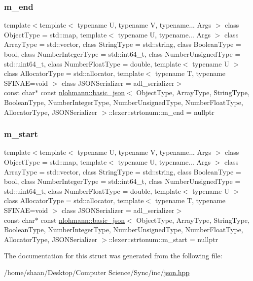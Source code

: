 \subsubsection{\texorpdfstring{m\+\_\+end}{m\_end}}
{\footnotesize\ttfamily template$<$template$<$ typename U, typename V, typename... Args $>$ class Object\+Type = std\+::map, template$<$ typename U, typename... Args $>$ class Array\+Type = std\+::vector, class String\+Type  = std\+::string, class Boolean\+Type  = bool, class Number\+Integer\+Type  = std\+::int64\+\_\+t, class Number\+Unsigned\+Type  = std\+::uint64\+\_\+t, class Number\+Float\+Type  = double, template$<$ typename U $>$ class Allocator\+Type = std\+::allocator, template$<$ typename T, typename S\+F\+I\+N\+A\+E=void $>$ class J\+S\+O\+N\+Serializer = adl\+\_\+serializer$>$ \\
const char$\ast$ const \hyperlink{classnlohmann_1_1basic__json}{nlohmann\+::basic\+\_\+json}$<$ Object\+Type, Array\+Type, String\+Type, Boolean\+Type, Number\+Integer\+Type, Number\+Unsigned\+Type, Number\+Float\+Type, Allocator\+Type, J\+S\+O\+N\+Serializer $>$\+::lexer\+::strtonum\+::m\+\_\+end = nullptr\hspace{0.3cm}{\ttfamily [private]}}

\mbox{\label{structnlohmann_1_1basic__json_1_1lexer_1_1strtonum_a325d967d65cab640cabbea12c8531c28}} 
\subsubsection{\texorpdfstring{m\+\_\+start}{m\_start}}
{\footnotesize\ttfamily template$<$template$<$ typename U, typename V, typename... Args $>$ class Object\+Type = std\+::map, template$<$ typename U, typename... Args $>$ class Array\+Type = std\+::vector, class String\+Type  = std\+::string, class Boolean\+Type  = bool, class Number\+Integer\+Type  = std\+::int64\+\_\+t, class Number\+Unsigned\+Type  = std\+::uint64\+\_\+t, class Number\+Float\+Type  = double, template$<$ typename U $>$ class Allocator\+Type = std\+::allocator, template$<$ typename T, typename S\+F\+I\+N\+A\+E=void $>$ class J\+S\+O\+N\+Serializer = adl\+\_\+serializer$>$ \\
const char$\ast$ const \hyperlink{classnlohmann_1_1basic__json}{nlohmann\+::basic\+\_\+json}$<$ Object\+Type, Array\+Type, String\+Type, Boolean\+Type, Number\+Integer\+Type, Number\+Unsigned\+Type, Number\+Float\+Type, Allocator\+Type, J\+S\+O\+N\+Serializer $>$\+::lexer\+::strtonum\+::m\+\_\+start = nullptr\hspace{0.3cm}{\ttfamily [private]}}



The documentation for this struct was generated from the following file\+:\begin{DoxyCompactItemize}
\item 
/home/shaan/\+Desktop/\+Computer Science/\+Sync/inc/\hyperlink{json_8hpp}{json.\+hpp}\end{DoxyCompactItemize}
